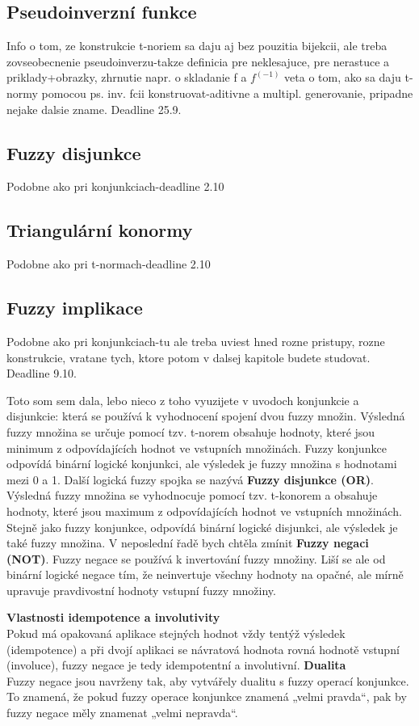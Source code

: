 \subsection{Pseudoinverzn\'i funkce} Info o tom, ze konstrukcie t-noriem sa daju aj bez pouzitia bijekcii, ale treba zovseobecnenie pseudoinverzu-takze definicia pre neklesajuce, pre nerastuce a priklady+obrazky, zhrnutie napr. o skladanie f a $f^{(-1)}$ veta o tom, ako sa daju t-normy pomocou ps. inv. fcii konstruovat-aditivne a multipl. generovanie, pripadne nejake dalsie zname. Deadline 25.9.
\subsection{Fuzzy disjunkce} Podobne ako pri konjunkciach-deadline 2.10
\subsection{Triangul\'arn\'i konormy} Podobne ako pri t-normach-deadline 2.10
\subsection{Fuzzy implikace} Podobne ako pri konjunkciach-tu ale treba uviest hned rozne pristupy, rozne konstrukcie, vratane tych, ktore potom v dalsej kapitole budete studovat. Deadline 9.10.

{\color{red} Toto som sem dala, lebo nieco z toho vyuzijete v uvodoch konjunkcie a disjunkcie: která se používá k vyhodnocení spojení dvou fuzzy množin. Výsledná fuzzy množina se určuje pomocí tzv. t-norem obsahuje hodnoty, které jsou minimum z odpovídajících hodnot ve vstupních množinách. Fuzzy konjunkce odpovídá binární logické konjunkci, ale výsledek je fuzzy množina s hodnotami mezi 0 a 1. Další logická fuzzy spojka se nazývá \textbf{Fuzzy disjunkce (OR)}. Výsledná fuzzy množina se vyhodnocuje pomocí tzv. t-konorem a obsahuje hodnoty, které jsou maximum z odpovídajících hodnot ve vstupních množinách. Stejně jako fuzzy konjunkce, odpovídá binární logické disjunkci, ale výsledek je také fuzzy množina. V neposlední řadě bych chtěla zmínit \textbf{Fuzzy negaci (NOT)}. Fuzzy negace se používá k invertování fuzzy množiny. Liší se ale od binární logické negace tím, že neinvertuje všechny hodnoty na opačné, ale mírně upravuje pravdivostní hodnoty vstupní fuzzy množiny.


\textbf{Vlastnosti idempotence a involutivity} \\
        Pokud má opakovaná aplikace stejných hodnot vždy tentýž výsledek (idempotence) a při dvojí aplikaci se návratová hodnota rovná hodnotě vstupní (involuce), fuzzy negace je tedy idempotentní a involutivní. 
\textbf{Dualita} \\
        Fuzzy negace jsou navrženy tak, aby vytvářely dualitu s fuzzy operací konjunkce. To znamená, že pokud fuzzy operace konjunkce znamená „velmi pravda“, pak by fuzzy negace měly znamenat „velmi nepravda“. }